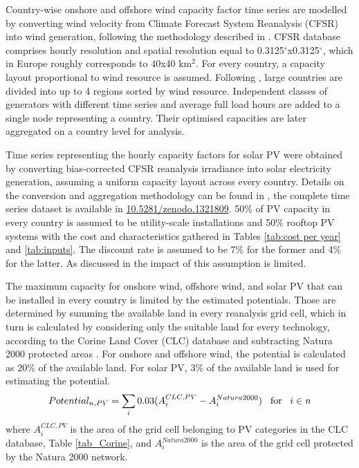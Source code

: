 \documentclass[3p]{elsarticle} %
\begin{document}
Country-wise onshore and offshore wind capacity factor time series are modelled by converting wind velocity from Climate Forecast System Reanalysis (CFSR) \cite{CFSR} into wind generation, following the methodology described in \cite{Andresen_2015}. CFSR database comprises hourly resolution and spatial resolution equal to 0.3125$^{\circ}$x0.3125$^{\circ}$, which in Europe roughly corresponds to 40x40 km$^2$. For every country, a capacity layout proportional to wind resource is assumed. Following \cite{Schlachtberger_2017}, large countries are divided into up to 4 regions sorted by wind resource. Independent classes of generators with different time series and average full load hours are added to a single node representing a country. Their optimised capacities are later aggregated on a country level for analysis. \

Time series representing the hourly capacity factors for solar PV were obtained by converting bias-corrected CFSR reanalysis irradiance into solar electricity generation, assuming a uniform capacity layout across every country. Details on the conversion and aggregation methodology can be found in \cite{Victoria_2019b}, the complete time series dataset is available in \href{https://doi.org/10.5281/zenodo.1321809}{10.5281/zenodo.1321809}. 50\% of PV capacity in every country is assumed to be utility-scale installations and 50\% rooftop PV systems with the cost and characteristics gathered in Tables \ref{tab:cost per year} and \ref{tab:inputs}. The discount rate is assumed to be 7\% for the former and 4\% for the latter. As discussed in \cite{Victoria_2019_EUPVSEC} the impact of this assumption is limited. \

The maximum capacity for onshore wind, offshore wind, and solar PV that can be installed in every country is limited by the estimated potentials. Those are determined by summing the available land in every reanalysis grid cell, which in turn is calculated by considering only the suitable land for every technology, according to the Corine Land Cover (CLC) database \cite{Corine_2014} and subtracting Natura 2000 protected areas \cite{Natura2000}. For onshore and offshore wind, the potential is calculated as 20\% of the available land. For solar PV, 3\% of the available land is used for estimating the potential.
\begin{equation}
	Potential_{n, PV} =\sum_i 0.03 ( A^{CLC, PV}_i - A^{Natura 2000}_i) \hspace{0.3cm} \text{for} \hspace{0.3cm} i \in n
\end{equation}
where $A^{CLC, PV}_i$ is the area of the grid cell belonging to PV categories in the CLC database, Table \ref{tab_Corine}, and $A^{Natura 2000}_i$ is the area of the grid cell protected by the Natura 2000 network. 
\end{document}

